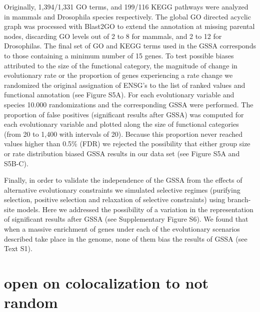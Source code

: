 Originally, 1,394/1,331 GO terms, and 199/116 KEGG pathways were analyzed in mammals and Drosophila species respectively. The global GO directed acyclic graph was processed with Blast2GO \cite{Conesa2005} to extend the annotation at missing parental nodes, discarding GO levels out of 2 to 8 for mammals, and 2 to 12 for Drosophilas. The final set of GO and KEGG terms used in the GSSA corresponds to those containing a minimum number of 15 genes. To test possible biases attributed to the size of the functional category, the magnitude of change in evolutionary rate or the proportion of genes experiencing a rate change we randomized the original assignation of ENSG's to the list of ranked values and functional annotation (see Figure S5A). For each evolutionary variable and species 10.000 randomizations and the corresponding GSSA were performed. The proportion of false positives (significant results after GSSA) was computed for each evolutionary variable and plotted along the size of functional categories (from 20 to 1,400 with intervals of 20). Because this proportion never reached values higher than 0.5\% (FDR) we rejected the possibility that either group size or rate distribution biased GSSA results in our data set (see Figure S5A and S5B-C).

Finally, in order to validate the independence of the GSSA from the effects of alternative evolutionary constraints we simulated selective regimes (purifying selection, positive selection and relaxation of selective constraints) using branch-site models. Here we addressed the possibility of a variation in the representation of significant results after GSSA (see Supplementary Figure S6). We found that when a massive enrichment of genes under each of the evolutionary scenarios described take place in the genome, none of them bias the results of GSSA (see Text S1).

\section{open on colocalization to not random}

